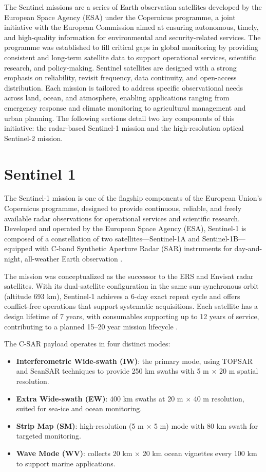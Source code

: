 The Sentinel missions are a series of Earth observation satellites developed by the European Space Agency (ESA) under the Copernicus programme, a joint initiative with the European Commission aimed at ensuring autonomous, timely, and high-quality information for environmental and security-related services. The programme was established to fill critical gaps in global monitoring by providing consistent and long-term satellite data to support operational services, scientific research, and policy-making. Sentinel satellites are designed with a strong emphasis on reliability, revisit frequency, data continuity, and open-access distribution. Each mission is tailored to address specific observational needs across land, ocean, and atmosphere, enabling applications ranging from emergency response and climate monitoring to agricultural management and urban planning. The following sections detail two key components of this initiative: the radar-based Sentinel-1 mission and the high-resolution optical Sentinel-2 mission.


\section{Sentinel 1}

The Sentinel-1 mission is one of the flagship components of the European Union’s Copernicus programme, designed to provide continuous, reliable, and freely available radar observations for operational services and scientific research. Developed and operated by the European Space Agency (ESA), Sentinel-1 is composed of a constellation of two satellites—Sentinel-1A and Sentinel-1B—equipped with C-band Synthetic Aperture Radar (SAR) instruments for day-and-night, all-weather Earth observation \cite{TORRES20129}.

The mission was conceptualized as the successor to the ERS and Envisat radar satellites. With its dual-satellite configuration in the same sun-synchronous orbit (altitude 693 km), Sentinel-1 achieves a 6-day exact repeat cycle and offers conflict-free operations that support systematic acquisitions. Each satellite has a design lifetime of 7 years, with consumables supporting up to 12 years of service, contributing to a planned 15–20 year mission lifecycle \cite{TORRES20129}.

The C-SAR payload operates in four distinct modes:
\begin{itemize}
    \item \textbf{Interferometric Wide-swath (IW)}: the primary mode, using TOPSAR and ScanSAR techniques to provide 250 km swaths with 5 m $\times$ 20 m spatial resolution.
    \item \textbf{Extra Wide-swath (EW)}: 400 km swaths at 20 m $\times$ 40 m resolution, suited for sea-ice and ocean monitoring.
    \item \textbf{Strip Map (SM)}: high-resolution (5 m $\times$ 5 m) mode with 80 km swath for targeted monitoring.
    \item \textbf{Wave Mode (WV)}: collects 20 km $\times$ 20 km ocean vignettes every 100 km to support marine applications.
\end{itemize}

